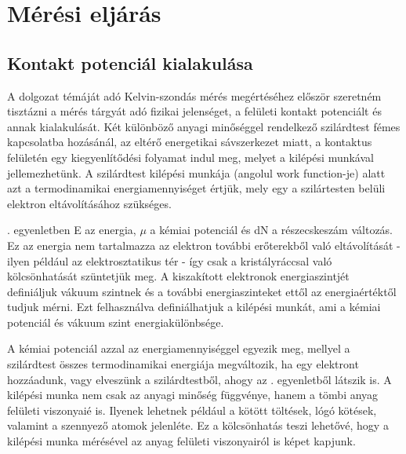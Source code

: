 \chapter{Mérési eljárás}

\section{Kontakt potenciál kialakulása}
\label{contact}

A dolgozat témáját adó Kelvin-szondás mérés megértéséhez először szeretném tisztázni a mérés tárgyát adó fizikai jelenséget, a felületi kontakt potenciált és annak kialakulását. Két különböző anyagi minőséggel rendelkező szilárdtest fémes kapcsolatba hozásánál, az eltérő energetikai sávszerkezet miatt, a kontaktus felületén egy kiegyenlítődési folyamat indul meg, melyet a kilépési munkával jellemezhetünk. A szilárdtest kilépési munkája (angolul work function-je) alatt azt a termodinamikai energiamennyiséget értjük, mely egy a szilártesten belüli elektron eltávolításához szükséges.


. egyenletben E az energia, $\mu$ a kémiai potenciál és dN a részecskeszám változás. Ez az energia nem tartalmazza az elektron további erőterekből való eltávolítását - ilyen például az elektrosztatikus tér - így csak a kristályráccsal való kölcsönhatását szüntetjük meg. A kiszakított elektronok energiaszintjét definiáljuk vákuum szintnek és a további energiaszinteket ettől az energiaértéktől tudjuk mérni. Ezt felhasználva definiálhatjuk a kilépési munkát, ami a kémiai potenciál és vákuum szint energiakülönbsége.


A kémiai potenciál azzal az energiamennyiséggel egyezik meg, mellyel a szilárdtest összes termodinamikai energiája megváltozik, ha egy elektront hozzáadunk, vagy elveszünk a szilárdtestből, ahogy az . egyenletből látszik is. A kilépési munka nem csak az anyagi minőség függvénye, hanem a tömbi anyag felületi viszonyaié is. Ilyenek lehetnek például a kötött töltések, lógó kötések, valamint a szennyező atomok jelenléte. Ez a kölcsönhatás teszi lehetővé, hogy a kilépési munka mérésével az anyag felületi viszonyairól is képet kapjunk.

